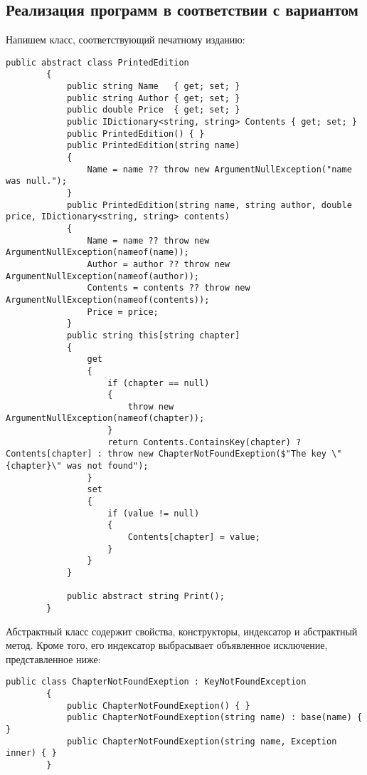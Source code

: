 \documentclass[a4paper,14pt]{extarticle}
\begin{document}
    \subsection{Реализация программ в соответствии с вариантом}
    Напишем класс, соответствующий печатному изданию:
    \begin{lstlisting}[language={[Sharp]C}]
        public abstract class PrintedEdition
        {
            public string Name   { get; set; }
            public string Author { get; set; }
            public double Price  { get; set; }
            public IDictionary<string, string> Contents { get; set; }
            public PrintedEdition() { }
            public PrintedEdition(string name)
            {
                Name = name ?? throw new ArgumentNullException("name was null.");
            } 
            public PrintedEdition(string name, string author, double price, IDictionary<string, string> contents)
            {
                Name = name ?? throw new ArgumentNullException(nameof(name));
                Author = author ?? throw new ArgumentNullException(nameof(author));
                Contents = contents ?? throw new ArgumentNullException(nameof(contents));
                Price = price;
            }
            public string this[string chapter]
            {
                get 
                {
                    if (chapter == null)
                    {
                        throw new ArgumentNullException(nameof(chapter));
                    }
                    return Contents.ContainsKey(chapter) ? Contents[chapter] : throw new ChapterNotFoundExeption($"The key \"{chapter}\" was not found");
                }
                set
                {
                    if (value != null)
                    {
                        Contents[chapter] = value;
                    }
                }
            }

            public abstract string Print();
        }       
    \end{lstlisting}
    Абстрактный класс содержит свойства, конструкторы, индексатор и абстрактный метод.
    Кроме того, его индексатор выбрасывает объявленное исключение, представленное ниже:

    \begin{lstlisting}[language={[Sharp]C}]
        public class ChapterNotFoundExeption : KeyNotFoundException
        {
            public ChapterNotFoundExeption() { }
            public ChapterNotFoundExeption(string name) : base(name) { }
            public ChapterNotFoundExeption(string name, Exception inner) { }
        }
    \end{lstlisting}
\end{document}
